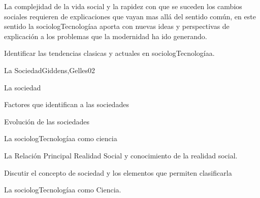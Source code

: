 \begin{syllabus}


\begin{justification}
La complejidad de la vida social y la rapidez con que se suceden los cambios sociales requieren 
de explicaciones que vayan mas allá del sentido común, en este sentido la sociologTecnologíaa 
aporta con nuevas ideas y perspectivas de explicación a los problemas que la modernidad 
ha ido generando.
\end{justification}

\begin{goals}
\item Identificar las tendencias clasicas y actuales en sociologTecnologíaa.
\end{goals}

\begin{outcomes}
\end{outcomes}

\begin{unit}{La Sociedad}{Giddens,Gelles}{0}{2}
    \begin{topics}
      \item La sociedad
      \item Factores que identifican a las sociedades
      \item Evolución de las sociedades
      \item La sociologTecnologíaa como ciencia
      \item La Relación Principal Realidad Social y conocimiento de la realidad social.
    \end{topics}
    \begin{unitgoals}
      \item Discutir el concepto de sociedad y los elementos que permiten clasificarla
      \item La sociologTecnologíaa como Ciencia.
    \end{unitgoals}
\end{unit}


\end{syllabus}
